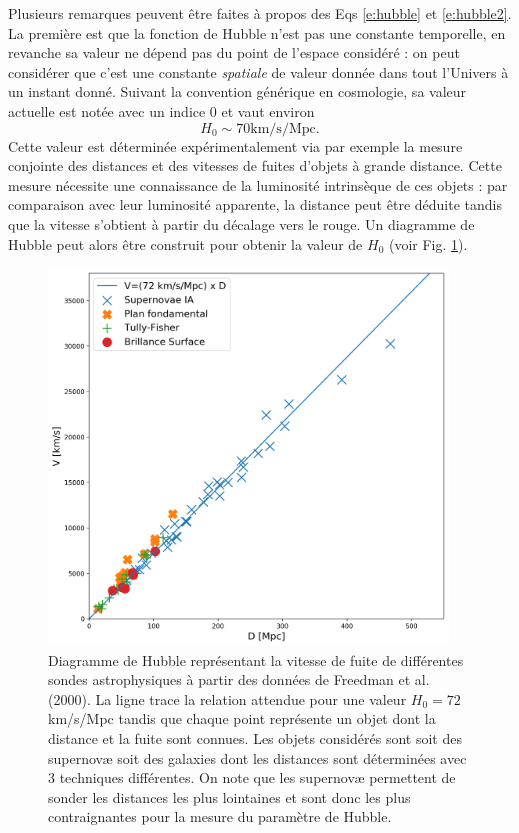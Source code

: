 Plusieurs remarques peuvent être faites à propos des Eqs \ref{e:hubble} et \ref{e:hubble2}.  La première est que la fonction de Hubble n'est pas une constante temporelle, en revanche sa valeur ne dépend pas du point de l'espace considéré : on peut considérer que c'est une constante \textit{spatiale} de valeur donnée dans tout l'Univers à un instant donné. Suivant la convention générique en cosmologie, sa valeur actuelle est notée avec un indice 0 et vaut environ
\begin{equation}
H_0 \sim 70 \mathrm{km/s/Mpc}.
\end{equation}
Cette valeur est déterminée expérimentalement via par exemple la mesure conjointe des distances et des vitesses de fuites d'objets à grande distance. Cette mesure nécessite une connaissance de la luminosité intrinsèque de ces objets  : par comparaison avec leur luminosité apparente, la distance peut être déduite tandis que la vitesse s'obtient à partir du décalage vers le rouge. Un diagramme de Hubble peut alors être construit pour obtenir la valeur de $H_0$ (voir Fig. \ref{f:hubblediag}).
\begin{figure}[htbp]
	\centering
		\includegraphics[height=10cm]{figs/hubble.png}
	\caption[Diagramme de Hubble]{Diagramme de Hubble représentant la vitesse de fuite de différentes sondes astrophysiques à partir des données de Freedman et al. (2000). La ligne trace la relation attendue pour une valeur $H_0=72$ km/s/Mpc tandis que chaque point représente un objet dont la distance et la fuite sont connues. Les objets considérés sont soit des supernovæ soit des galaxies dont les distances sont déterminées avec 3 techniques différentes. On note que les supernovæ permettent de sonder les distances les plus lointaines et sont donc les plus contraignantes pour la mesure du paramètre de Hubble. }
	\label{f:hubblediag}
\end{figure}

